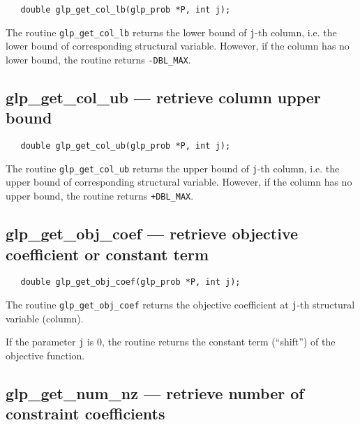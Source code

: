 \synopsis

\begin{verbatim}
   double glp_get_col_lb(glp_prob *P, int j);
\end{verbatim}

\returns

The routine \verb|glp_get_col_lb| returns the lower bound of
\verb|j|-th column, i.e. the lower bound of corresponding structural
variable. However, if the column has no lower bound, the routine
returns \verb|-DBL_MAX|.

\subsection{glp\_get\_col\_ub --- retrieve column upper bound}

\synopsis

\begin{verbatim}
   double glp_get_col_ub(glp_prob *P, int j);
\end{verbatim}

\returns

The routine \verb|glp_get_col_ub| returns the upper bound of
\verb|j|-th column, i.e. the upper bound of corresponding structural
variable. However, if the column has no upper bound, the routine
returns \verb|+DBL_MAX|.

\subsection{glp\_get\_obj\_coef --- retrieve objective coefficient or
constant term}

\synopsis

\begin{verbatim}
   double glp_get_obj_coef(glp_prob *P, int j);
\end{verbatim}

\returns

The routine \verb|glp_get_obj_coef| returns the objective coefficient
at \verb|j|-th structural variable (column).

If the parameter \verb|j| is 0, the routine returns the constant term
(``shift'') of the objective function.

\subsection{glp\_get\_num\_nz --- retrieve number of constraint
coefficients}

\synopsis


